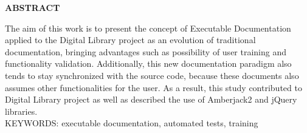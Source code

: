 \begin{center}
\textbf{ABSTRACT}
\end{center}
\singlespacing

\noindent The aim of this work is to present the concept of Executable Documentation applied to the Digital Library project as an evolution of traditional documentation, bringing advantages such as possibility of user training and functionality validation. Additionally, this new documentation paradigm also tends to stay synchronized with the source code, because these documents also assumes other functionalities for the user. As a result, this study contributed to Digital Library project as well as described the use of Amberjack2 and jQuery libraries. \\

\noindent KEYWORDS: executable documentation, automated tests, training